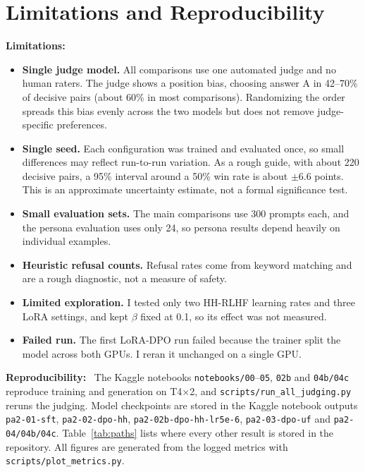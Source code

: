 \documentclass[10pt,a4paper]{article}
\newcommand{\code}[1]{\texttt{#1}}
\newcommand{\para}[1]{\textbf{#1}\ }
\begin{document}
\section{Limitations and Reproducibility}

\para{Limitations:}
\begin{itemize}
  \item \textbf{Single judge model.} All comparisons use one automated judge and no human raters. The judge shows a position bias, choosing answer A in 42--70\% of decisive pairs (about 60\% in most comparisons). Randomizing the order spreads this bias evenly across the two models but does not remove judge-specific preferences.
  \item \textbf{Single seed.} Each configuration was trained and evaluated once, so small differences may reflect run-to-run variation. As a rough guide, with about 220 decisive pairs, a 95\% interval around a 50\% win rate is about $\pm6.6$ points. This is an approximate uncertainty estimate, not a formal significance test.
  \item \textbf{Small evaluation sets.} The main comparisons use 300 prompts each, and the persona evaluation uses only 24, so persona results depend heavily on individual examples.
  \item \textbf{Heuristic refusal counts.} Refusal rates come from keyword matching and are a rough diagnostic, not a measure of safety.
  \item \textbf{Limited exploration.} I tested only two HH-RLHF learning rates and three LoRA settings, and kept $\beta$ fixed at 0.1, so its effect was not measured.
  \item \textbf{Failed run.} The first LoRA-DPO run failed because the trainer split the model across both GPUs. I reran it unchanged on a single GPU.
\end{itemize}

\para{Reproducibility:} The Kaggle notebooks \code{notebooks/00}--\code{05}, \code{02b} and \code{04b/04c} reproduce training and generation on T4$\times$2, and \code{scripts/run\_all\_judging.py} reruns the judging. Model checkpoints are stored in the Kaggle notebook outputs \code{pa2-01-sft}, \code{pa2-02-dpo-hh}, \code{pa2-02b-dpo-hh-lr5e-6}, \code{pa2-03-dpo-uf} and \code{pa2-04/04b/04c}. Table~\ref{tab:paths} lists where every other result is stored in the repository. All figures are generated from the logged metrics with \nolinkurl{scripts/plot_metrics.py}.
\end{document}

